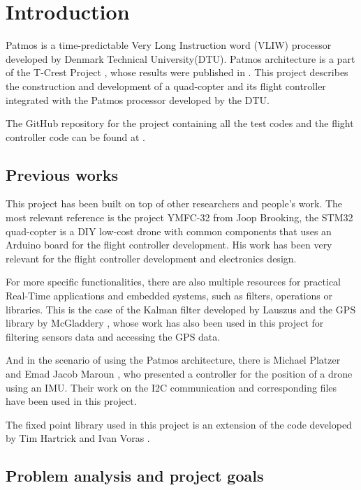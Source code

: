 \chapter{Introduction}\label{ch:intro}

Patmos is a time-predictable Very Long Instruction word (VLIW) processor developed by Denmark Technical University(DTU). Patmos architecture is a part of the T-Crest Project \cite{bib:t-crest}, whose results were published in  \cite{SCHOEBERL2015449}.  This project describes the construction and development of a quad-copter and its flight controller integrated with the Patmos processor developed by the DTU.

The GitHub repository for the project containing all the test codes and the flight controller code can be found at \cite{bib:multicore_repo}.

\section{Previous works}
This project has been built on top of other researchers and people's work. The most relevant reference is the project YMFC-32 from Joop Brooking\cite{bib:brooking}, the STM32 quad-copter is a DIY low-cost drone with common components that uses an Arduino board for the flight controller development. His work has been very relevant for the flight controller development and electronics design.

For more specific functionalities, there are also multiple resources for practical Real-Time applications and embedded systems, such as filters, operations or libraries. 
This is the case of the Kalman filter developed by Lauszus\cite{bib:kalmanAAU} and the GPS library by  McGladdery \cite{bib:gpsLib}, whose work has also been used in this project for filtering sensors data and accessing the GPS data.


And in the scenario of using the Patmos architecture, there is Michael Platzer and Emad Jacob Maroun \cite{bib:tu_viena}, who presented a controller for the position of a drone using an IMU. Their work on the I2C communication and corresponding files have been used in this project. 

The fixed point library used in this project is an extension of the code developed by Tim Hartrick and Ivan Voras \cite{bib:fixedpth}.

\section{Problem analysis and project goals}\label{sec:prob_analysis}

